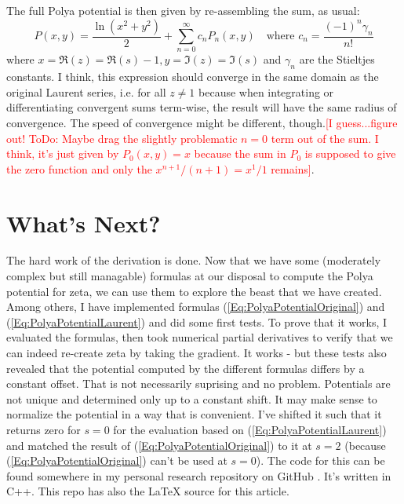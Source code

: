 \documentclass[12pt]{article}
\begin{document}
The full Polya potential is then given by re-assembling the sum, as usual:
\begin{equation}
\label{Eq:PolyaPotentialLaurent}	
\boxed{
P(x,y) = \frac{\ln(x^2 + y^2)}{2} + \sum_{n=0}^{\infty} c_n P_n(x,y)
}
\quad \text{where } c_n = \frac{(-1)^n \gamma_n}{n!}
\end{equation}
where $x = \Re(z) = \Re(s) - 1, y = \Im(z) = \Im(s)$ and $\gamma_n$ are the Stieltjes constants. I think, this expression should converge in the same domain as the original Laurent series, i.e. for all $z \neq 1$ because when integrating or differentiating convergent sums term-wise, the result will have the same radius of convergence. The speed of convergence might be different, though.\textcolor{red}{[I guess...figure out! ToDo: Maybe drag the slightly problematic $n=0$ term out of the sum. I think, it's just given by $P_0(x,y) = x$ because the sum in $P_0$ is supposed to give the zero function and only the $x^{n+1}/(n+1) = x^1/1$ remains]}.

\section{What's Next?}
The hard work of the derivation is done. Now that we have some (moderately complex but still managable) formulas at our disposal to compute the Polya potential for zeta, we can use them to explore the beast that we have created. Among others, I have implemented formulas (\ref{Eq:PolyaPotentialOriginal}) and (\ref{Eq:PolyaPotentialLaurent}) and did some first tests. To prove that it works, I evaluated the formulas, then took numerical partial derivatives to verify that we can indeed re-create zeta by taking the gradient. It works - but these tests also revealed that the potential computed by the different formulas differs by a constant offset. That is not necessarily suprising and no problem. Potentials are not unique and determined only up to a constant shift. It may make sense to normalize the potential in a way that is convenient. I've shifted it such that it returns zero for $s=0$ for the evaluation based on (\ref{Eq:PolyaPotentialLaurent}) and matched the result of (\ref{Eq:PolyaPotentialOriginal}) to it at $s=2$ (because (\ref{Eq:PolyaPotentialOriginal}) can't be used at $s=0$). The code for this can be found somewhere in my personal research repository on GitHub \cite{GitHub}. It's written in C++. This repo has also the LaTeX source for this article.
\end{document}
